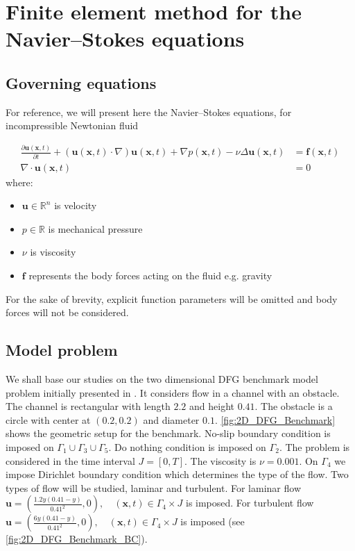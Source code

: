 \chapter{Finite element method for the Navier--Stokes equations}\label{ch:fem}
\section{Governing equations}

For reference, we will present here the Navier--Stokes equations, for incompressible Newtonian fluid \cite{Larson-Bengzon}

\begin{align}
  \label{eq:NavierStokesConservation}
  \frac{\partial \mathbf{u}(\mathbf{x}, t)}{\partial t} + \left(\mathbf{u}(\mathbf{x}, t)\cdot\nabla\right)\mathbf{u}(\mathbf{x}, t) + \nabla p(\mathbf{x}, t) - \nu\Delta\mathbf{u}(\mathbf{x}, t) &= \mathbf{f}(\mathbf{x}, t)\\
  \label{eq:NavierStokesContinuity}
  \nabla \cdot \mathbf{u}(\mathbf{x}, t) &= 0
\end{align}
where:
\begin{itemize}
  \item $\mathbf{u} \in \mathbb{R}^n$ is velocity
  \item $p \in \mathbb{R}$ is mechanical pressure
  \item $\nu$ is viscosity
  \item $\mathbf{f}$ represents the body forces acting on the fluid e.g. gravity
\end{itemize}

For the sake of brevity, explicit function parameters will be omitted and body forces will not be considered.

\section{Model problem}
We shall base our studies on the two dimensional DFG benchmark model problem initially presented in \cite{dfg-problem}. It considers flow in a channel with an obstacle. The channel is rectangular with length $2.2$ and height $0.41$. The obstacle is a circle with center at $(0.2, 0.2)$ and diameter $0.1$. \cref{fig:2D_DFG_Benchmark} shows the geometric setup for the benchmark. No-slip boundary condition is imposed on $\Gamma_1 \cup \Gamma_3 \cup \Gamma_5$. Do nothing condition is imposed on $\Gamma_2$. The problem is considered in the time interval $J = \left[0, T\right]$. The viscosity is $\nu = 0.001$. On $\Gamma_4$ we impose Dirichlet boundary condition which determines the type of the flow. Two types of flow will be studied, laminar and turbulent. For laminar flow $\mathbf{u} = \left(\frac{1.2y\left(0.41 - y\right)}{0.41^2}, 0\right), \quad \left(\mathbf{x}, t\right) \in \Gamma_4 \times J$ is imposed. For turbulent flow $\mathbf{u} = \left(\frac{6y(0.41-y)}{0.41^2}, 0\right), \quad \left(\mathbf{x}, t\right) \in \Gamma_4 \times J$ is imposed (see \cref{fig:2D_DFG_Benchmark_BC}).

